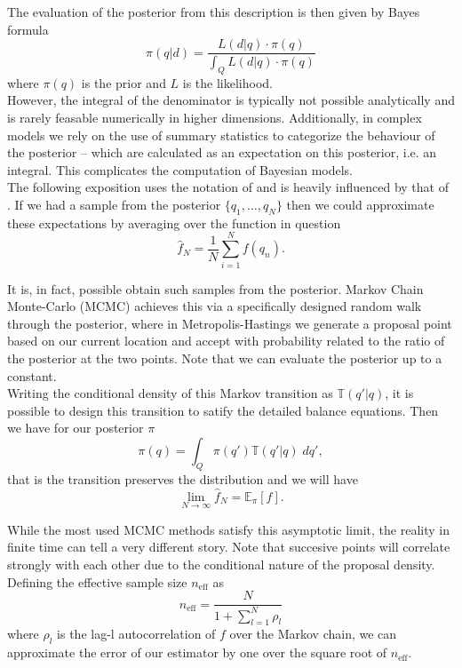 \documentclass[11pt]{report}
\begin{document}
The evaluation of the posterior from this description is then given by Bayes formula
\begin{equation}
\pi(q | d) = \frac{L(d | q) \cdot \pi(q)}{\int_Q L(d | q) \cdot \pi(q)}
\end{equation}
where $\pi(q)$ is the prior and $L$ is the likelihood. \\

However, the integral of the denominator is typically not possible analytically and is rarely feasable numerically in higher dimensions. Additionally, in complex models we rely on the use of summary statistics to categorize the behaviour of the posterior -- which are calculated as an expectation on this posterior, i.e. an integral. This complicates the computation of Bayesian models. \\

The following exposition uses the notation of and is heavily influenced by that of \citet{conceptual}. If we had a sample from the posterior $\{q_1, \ldots, q_N\}$ then we could approximate these expectations by averaging over the function in question
\begin{equation} \label{fig:approx}
\hat{f}_N = \frac{1}{N} \sum_{i=1}^N f(q_n).
\end{equation} 

It is, in fact, possible obtain such samples from the posterior. Markov Chain Monte-Carlo (MCMC) achieves this via a specifically designed random walk through the posterior, where in Metropolis-Hastings we generate a proposal point based on our current location and accept with probability related to the ratio of the posterior at the two points. Note that we can evaluate the posterior up to a constant. \\

Writing the conditional density of this Markov transition as $\mathbb{T}(q'|q)$, it is possible to design this transition to satify the detailed balance equations. Then we have for our posterior $\pi$ 
\begin{equation}
\pi(q) = \int_{Q} \pi(q') \mathbb{T}(q'|q) \; dq',
\end{equation}  
that is the transition preserves the distribution and we will have
\begin{equation}
\lim_{N\to\infty} \hat{f}_N = \mathbb{E}_\pi[f].
\end{equation}

While the most used MCMC methods satisfy this asymptotic limit, the reality in finite time can tell a very different story. Note that succesive points will correlate strongly with each other due to the conditional nature of the proposal density. Defining the effective sample size $n_{\text{eff}}$ as 
\begin{equation}
n_{\text{eff}} = \frac{N}{1 + \sum_{l=1}^N \rho_l}
\end{equation}
where $\rho_l$ is the lag-l autocorrelation of $f$ over the Markov chain, we can approximate the error of our estimator by one over the square root of $n_{\text{eff}}$. \\
\end{document}
